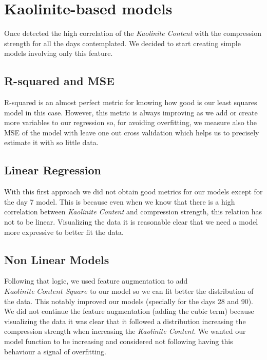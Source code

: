 \documentclass[10pt,conference,compsocconf]{IEEEtran}
\begin{document}
\section{Kaolinite-based models}


Once detected the high correlation of the \textit{Kaolinite Content} with the compression strength for all the days contemplated. We decided to start creating simple models involving only this feature. %

\subsection{R-squared and MSE}
R-squared is an almost perfect metric for knowing how good is our least squares model in this case. However, this metric is always improving as we add or create more variables to our regression so, for avoiding overfitting, we measure also the MSE of the model with leave one out cross validation which helps us to precisely estimate it with so little  data. 

\subsection{Linear Regression}
With this first approach we did not obtain good metrics for our models except for the day 7 model. This is because even when we know that there is a high correlation between \textit{Kaolinite Content} and compression strength, this relation has not to be linear. Visualizing the data it is reasonable clear that we need a model more expressive to better fit the data.

\subsection{Non Linear Models}
Following that logic, we used feature augmentation to add $\textit{Kaolinite Content Square}$ to our model so we can fit better the distribution of the data. This notably improved our models (specially for the days 28 and 90). We did not continue the feature augmentation (adding the cubic term) because visualizing the data it was clear that it followed a distribution increasing the compression strength when increasing the \textit{Kaolinite Content}. We wanted our model function to be increasing and considered not following having this behaviour a signal of overfitting.
\end{document}
